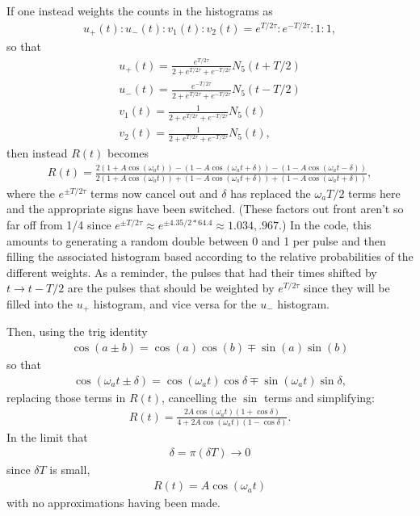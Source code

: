 If one instead weights the counts in the histograms as
	\begin{align}
		u_{+}(t) : u_{-}(t) : v_{1}(t) : v_{2}(t) = e^{T/2\tau} : e^{-T/2\tau} : 1 : 1,		
	\end{align}
so that
	\begin{align}
		u_{+}(t) = \frac{e^{T/2\tau}}{2 + e^{T/2\tau} + e^{-T/2\tau}} N_{5}(t+T/2) \\
		u_{-}(t) = \frac{e^{-T/2\tau}}{2 + e^{T/2\tau} + e^{-T/2\tau}} N_{5}(t-T/2) \\
		v_{1}(t) = \frac{1}{2 + e^{T/2\tau} + e^{-T/2\tau}} N_{5}(t) \\
		v_{2}(t) = \frac{1}{2 + e^{T/2\tau} + e^{-T/2\tau}} N_{5}(t),
	\end{align}
then instead $R(t)$ becomes 
	\begin{align}
		R(t) = \frac{2(1 + A \cos(\omega_{a}t)) - (1 - A \cos(\omega_{a}t + \delta)) - (1 - A \cos(\omega_{a}t - \delta))} {2(1 + A \cos(\omega_{a}t)) + (1 - A \cos(\omega_{a}t + \delta)) + (1 - A \cos(\omega_{a}t + \delta))},
	\end{align}
where the $e^{\pm T/ 2\tau}$ terms now cancel out and $\delta$ has replaced the $\omega_{a}T/2$ terms here and the appropriate signs have been switched. (These factors out front aren't so far off from 1/4 since $e^{\pm T/ 2\tau} \approx e^{\pm 4.35/ 2*64.4} \approx 1.034, .967$.) In the code, this amounts to generating a random double between 0 and 1 per pulse and then filling the associated histogram based according to the relative probabilities of the different weights. As a reminder, the pulses that had their times shifted by $t \rightarrow t - T/2$ are the pulses that should be weighted by $e^{T/2\tau}$ since they will be filled into the $u_{+}$ histogram, and vice versa for the $u_{-}$ histogram.

Then, using the trig identity 
	\begin{align}
		\cos(a \pm b) = \cos(a)\cos(b) \mp \sin(a)\sin(b)
	\end{align}
so that 
	\begin{align}
		\cos(\omega_{a}t \pm \delta) = \cos(\omega_{a}t)\cos{\delta} \mp \sin(\omega_{a}t)\sin{\delta},
	\end{align}
replacing those terms in $R(t)$, cancelling the $\sin$ terms and simplifying: 
	\begin{align}
		R(t) = \frac{2A \cos(\omega_{a}t) (1 + \cos{\delta} )} {4 + 2A \cos(\omega_{a}t) (1 - \cos{\delta} )}.
	\end{align}
In the limit that 
	\begin{align}
		\delta = \pi (\delta T) \rightarrow 0
	\end{align}
since $\delta T$ is small, 
	\begin{align}
		R(t) = A \cos(\omega_{a}t)
	\end{align}
with no approximations having been made.

